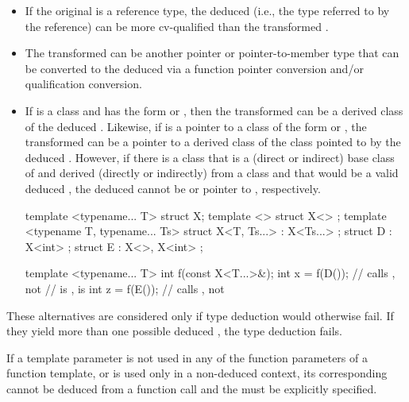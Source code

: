 \begin{itemize}
\item
If the original
is a reference type, the deduced
(i.e.,
the type referred to by the reference) can be more cv-qualified than
the transformed .
\item
The transformed 
can be another pointer or pointer-to-member type that can be converted
to the deduced
via a function pointer conversion and/or
qualification conversion.

\item
If
is a class and
has the form
 or
 ,
then
the transformed 
can be a derived class  of the
deduced
.
Likewise, if
is a pointer to a class of the form
 or
 ,
the transformed 
can be a pointer to a
derived class  of the class pointed to by the deduced
.
However, if there is a class  that is
a (direct or indirect) base class of  and
derived (directly or indirectly) from a class  and
that would be a valid deduced ,
the deduced  cannot be  or pointer to ,
respectively.
\begin{example}
\begin{codeblock}
template <typename... T> struct X;
template <> struct X<> {};
template <typename T, typename... Ts>
  struct X<T, Ts...> : X<Ts...> {};
struct D : X<int> {};
struct E : X<>, X<int> {};

template <typename... T>
int f(const X<T...>&);
int x = f(D());     // calls , not 
                    //  is ,  is 
int z = f(E());     // calls , not 
\end{codeblock}
\end{example}
\end{itemize}

\pnum
These alternatives are considered only if type deduction would
otherwise fail.
If they yield more than one possible deduced
,
the type deduction fails.
\begin{note}
If a template parameter
is not used in any of the function parameters of a function template,
or is used only in a non-deduced context, its corresponding
cannot be deduced from a function call and the
must be explicitly specified.
\end{note}

